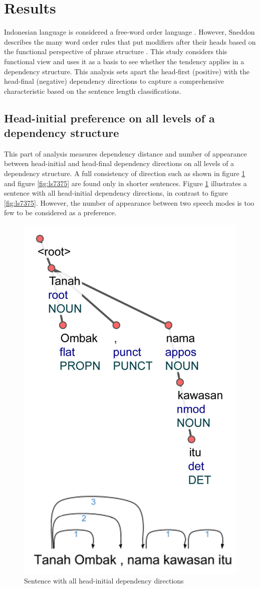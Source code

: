 \documentclass[10pt, a4paper, conference, compsocconf]{IEEEtran}
\begin{document}
\section{Results}
 
Indonesian language is considered a free-word order language \cite{sneddon2010indonesian}. However, Sneddon describes the many word order rules that put modifiers after their heads based on the functional perspective of phrase structure \cite{sneddon2010indonesian}. This study considers this functional view and uses it as a basis to see whether the tendency applies in a dependency structure. This analysis sets apart the head-first (positive) with the head-final (negative) dependency directions to capture a comprehensive characteristic based on the sentence length classifications. 

\subsection{Head-initial preference on all levels of a dependency structure}

This part of analysis measures dependency distance and number of appearance between head-initial and head-final dependency directions on all levels of a dependency structure. A full consistency of direction such as shown in figure \ref{fig:ts6841} and figure \ref{fig:ls7375} are found only in shorter sentences. Figure \ref{fig:ts6841} illustrates a sentence with all head-initial dependency directions, in contrast to figure \ref{fig:ls7375}. However, the number of appearance between two speech modes is too few to be considered as a preference.

\begin{figure}
\centering
\includegraphics[width=0.45\linewidth] {pics/ts6841.jpg} 
	\caption{Sentence with all head-initial dependency directions}
	\label{fig:ts6841} 
\end{figure}
\end{document}
